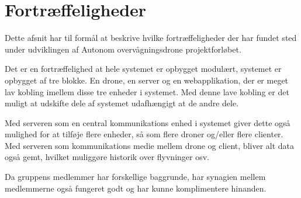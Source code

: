 \section{Fortræffeligheder}
Dette afsnit har til formål at beskrive hvilke fortræffeligheder der har fundet sted under udviklingen af Autonom overvågningsdrone projektforløbet.

Det er en fortræffelighed at hele systemet er opbygget modulært, systemet er opbygget af tre blokke. En drone, en server og en webapplikation, der er meget lav kobling imellem disse tre enheder i systemet. Med denne lave kobling er det muligt at udskifte dele af systemet udafhængigt at de andre dele. 

Med serveren som en central kommunikations enhed i systemet giver dette også mulighed for at tilføje flere enheder, så som flere droner og/eller flere clienter. Med serveren som kommunikations medie mellem drone og client, bliver alt data også gemt, hvilket muliggøre historik over flyvninger osv. 

Da gruppens medlemmer har forskellige baggrunde, har synagien mellem medlemmerne også fungeret godt og har kunne komplimentere hinanden. 